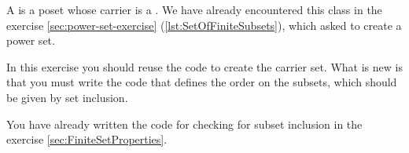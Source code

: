 


A  is a poset whose carrier is a .
We have already encountered this class in the exercise \cref{sec:power-set-exercise} (\cref{lst:SetOfFiniteSubsets}), which asked to create a power set. 

In this exercise you should reuse the code to create the carrier set. What is new is that you must write the code that defines the order on the subsets, which should be given by set inclusion. 

You have already written the code for checking for subset inclusion in the exercise \cref{sec:FiniteSetProperties}.




